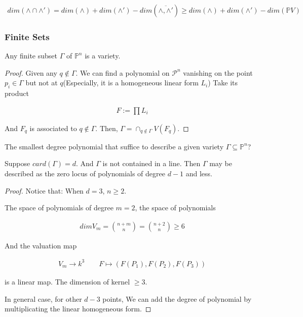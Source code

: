 \documentclass[Total.tex]{subfiles}
\begin{document}
			\begin{gather*}
				dim(\wedge\cap \wedge')=dim(\wedge)+dim(\wedge')-dim(\overline{\wedge,\wedge'})\geq dim(\wedge)+dim(\wedge')-dim(\mathbb{P}V)
			\end{gather*}
			
			
			
			\subsubsection{Finite Sets}
			
			\begin{proposition}
				Any finite subset $\Gamma$ of $\mathbb{P}^n$ is a variety.
			\end{proposition}
			
			\begin{proof}
				Given any $q\notin \Gamma$. We can find a polynomial on $\mathcal{P}^n$ vanishing on the point $p_i\in \Gamma$ but not at $q$(Especially, it is a homogeneous linear form $L_i$) Take its product
				
				\begin{gather*}
					F:=\prod L_i
				\end{gather*}
				
				And $F_q$ is associated to $q\notin \Gamma$. Then, $\Gamma=\cap_{q\notin \Gamma} V(F_q)$.
			\end{proof}
			
			\begin{prob}
				The smallest degree polynomial that suffice to describe a given variety $\Gamma\subseteq \mathbb{P}^n$?
			\end{prob}
			
			\begin{lemma}
				Suppose $card(\Gamma)=d$. And $\Gamma$ is not contained in a line. Then $\Gamma$ may be described as the zero locus of polynomials of degree $d-1$ and less.
			\end{lemma}
			
			\begin{proof}
				Notice that: When $d=3$, $n\geq 2$. 
				
				The space of polynomials of degree $m=2$, the space of polynomials
				
				\begin{gather*}
					dim V_m=\binom{n+m}{n}=\binom{n+2}{n}\geq 6
				\end{gather*}
				
				And the valuation map
				
				\begin{gather*}
					V_m\rightarrow k^3\qquad F\mapsto (F(P_1),F(P_2),F(P_3))
				\end{gather*}
				
				is a linear map. The dimension of kernel $\geq 3$. 
				
				In general case, for other $d-3$ points, We can add the degree of polynomial by multiplicating the linear homogeneous form.
			\end{proof}
			
\end{document}

